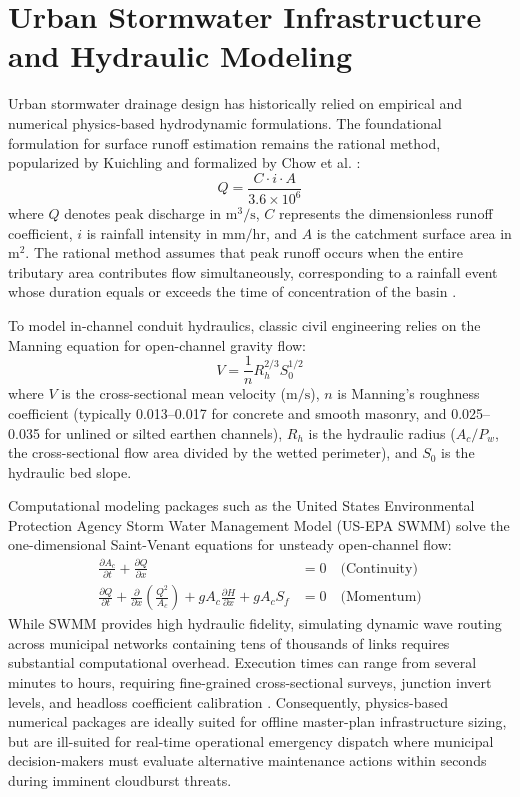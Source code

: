 \documentclass[12pt,a4paper]{report}
\begin{document}
\section{Urban Stormwater Infrastructure and Hydraulic Modeling}
Urban stormwater drainage design has historically relied on empirical and numerical physics-based hydrodynamic formulations. The foundational formulation for surface runoff estimation remains the rational method, popularized by Kuichling and formalized by Chow et al. \cite{chow1988applied}:
\begin{equation}
Q = \frac{C \cdot i \cdot A}{3.6 \times 10^6}
\label{eqn:rational_foundational}
\end{equation}
where $Q$ denotes peak discharge in $\text{m}^3/\text{s}$, $C$ represents the dimensionless runoff coefficient, $i$ is rainfall intensity in $\text{mm}/\text{hr}$, and $A$ is the catchment surface area in $\text{m}^2$. The rational method assumes that peak runoff occurs when the entire tributary area contributes flow simultaneously, corresponding to a rainfall event whose duration equals or exceeds the time of concentration of the basin \cite{butler2018urban}.

To model in-channel conduit hydraulics, classic civil engineering relies on the Manning equation for open-channel gravity flow:
\begin{equation}
V = \frac{1}{n} R_h^{2/3} S_0^{1/2}
\label{eqn:manning_formula}
\end{equation}
where $V$ is the cross-sectional mean velocity ($\text{m}/\text{s}$), $n$ is Manning's roughness coefficient (typically 0.013--0.017 for concrete and smooth masonry, and 0.025--0.035 for unlined or silted earthen channels), $R_h$ is the hydraulic radius ($A_c / P_w$, the cross-sectional flow area divided by the wetted perimeter), and $S_0$ is the hydraulic bed slope.

Computational modeling packages such as the United States Environmental Protection Agency Storm Water Management Model (US-EPA SWMM) \cite{rossman2015storm} solve the one-dimensional Saint-Venant equations for unsteady open-channel flow:
\begin{align}
\frac{\partial A_c}{\partial t} + \frac{\partial Q}{\partial x} &= 0 \quad \text{(Continuity)} \\
\frac{\partial Q}{\partial t} + \frac{\partial}{\partial x}\left(\frac{Q^2}{A_c}\right) + g A_c \frac{\partial H}{\partial x} + g A_c S_f &= 0 \quad \text{(Momentum)}
\end{align}
While SWMM provides high hydraulic fidelity, simulating dynamic wave routing across municipal networks containing tens of thousands of links requires substantial computational overhead. Execution times can range from several minutes to hours, requiring fine-grained cross-sectional surveys, junction invert levels, and headloss coefficient calibration \cite{rossman2015storm}. Consequently, physics-based numerical packages are ideally suited for offline master-plan infrastructure sizing, but are ill-suited for real-time operational emergency dispatch where municipal decision-makers must evaluate alternative maintenance actions within seconds during imminent cloudburst threats.
\end{document}
